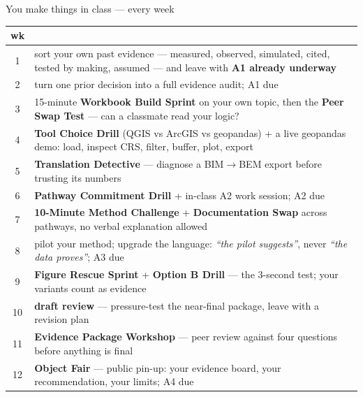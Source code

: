 \documentclass[aspectratio=169,10pt]{beamer}
\newcommand{\muted}[1]{{\color{cMute}#1}}
\begin{document}
\begin{frame}{You make things in class --- every week}
  \footnotesize
  \begin{tabular}{@{}c@{\hspace{4mm}}p{}@{}}
    \muted{wk} & \\
    \midrule
    1 & sort your own past evidence --- measured, observed, simulated, cited,
        tested by making, assumed --- and leave with \textbf{A1 already
        underway}\\
    2 & turn one prior decision into a full evidence audit; \muted{A1 due}\\
    3 & 15-minute \textbf{Workbook Build Sprint} on your own topic, then the
        \textbf{Peer Swap Test} --- can a classmate read your logic?\\
    4 & \textbf{Tool Choice Drill} (QGIS vs ArcGIS vs geopandas) + a live
        geopandas demo: load, inspect CRS, filter, buffer, plot, export\\
    5 & \textbf{Translation Detective} --- diagnose a BIM\(\rightarrow\)BEM
        export before trusting its numbers\\
    6 & \textbf{Pathway Commitment Drill} + in-class A2 work session;
        \muted{A2 due}\\
    7 & \textbf{10-Minute Method Challenge} + \textbf{Documentation Swap}
        across pathways, no verbal explanation allowed\\
    8 & pilot your method; upgrade the language: \emph{``the pilot suggests''},
        never \emph{``the data proves''}; \muted{A3 due}\\
    9 & \textbf{Figure Rescue Sprint} + \textbf{Option B Drill} --- the
        3-second test; your variants count as evidence\\
    10 & \textbf{draft review} --- pressure-test the near-final package,
        leave with a revision plan\\
    11 & \textbf{Evidence Package Workshop} --- peer review against four
        questions before anything is final\\
    12 & \textbf{Object Fair} --- public pin-up: your evidence board, your
        recommendation, your limits; \muted{A4 due}\\
  \end{tabular}
\end{frame}
\end{document}

